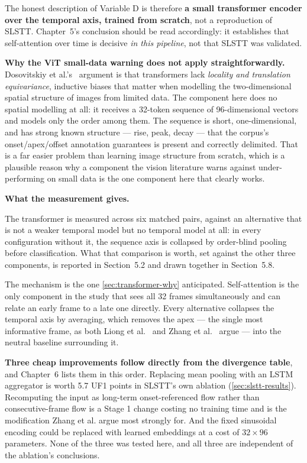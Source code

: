 The honest description of Variable D is therefore \textbf{a small transformer encoder over the temporal axis, trained from scratch}, not a reproduction of SLSTT. Chapter~5's conclusion should be read accordingly: it establishes that self-attention over time is decisive \textit{in this pipeline}, not that SLSTT was validated.

\textbf{Why the ViT small-data warning does not apply straightforwardly.} Dosovitskiy et al.'s~\cite{dosovitskiy2021} argument is that transformers lack \textit{locality and translation equivariance}, inductive biases that matter when modelling the two-dimensional spatial structure of images from limited data. The component here does no spatial modelling at all: it receives a 32-token sequence of 96-dimensional vectors and models only the order among them. The sequence is short, one-dimensional, and has strong known structure --- rise, peak, decay --- that the corpus's onset/apex/offset annotation guarantees is present and correctly delimited. That is a far easier problem than learning image structure from scratch, which is a plausible reason why a component the vision literature warns against under-performing on small data is the one component here that clearly works.

\textbf{What the measurement gives.}

The transformer is measured across six matched pairs, against an alternative that is not a weaker temporal model but no temporal model at all: in every configuration without it, the sequence axis is collapsed by order-blind pooling before classification. What that comparison is worth, set against the other three components, is reported in Section~5.2 and drawn together in Section~5.8.

The mechanism is the one \autoref{sec:transformer-why} anticipated. Self-attention is the only component in the study that sees all 32 frames simultaneously and can relate an early frame to a late one directly. Every alternative collapses the temporal axis by averaging, which removes the apex --- the single most informative frame, as both Liong et al.~\cite{liong2019a} and Zhang et al.~\cite{zhang2022} argue --- into the neutral baseline surrounding it.

\textbf{Three cheap improvements follow directly from the divergence table}, and Chapter~6 lists them in this order. Replacing mean pooling with an LSTM aggregator is worth 5.7 UF1 points in SLSTT's own ablation (\autoref{sec:slstt-results}). Recomputing the input as long-term onset-referenced flow rather than consecutive-frame flow is a Stage 1 change costing no training time and is the modification Zhang et al. argue most strongly for. And the fixed sinusoidal encoding could be replaced with learned embeddings at a cost of $32 \times 96$ parameters. None of the three was tested here, and all three are independent of the ablation's conclusions.

